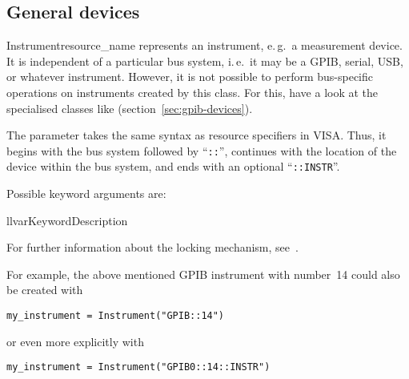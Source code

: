 \documentclass{howto}
\begin{document}
\subsection{General devices}
\label{sec:general-devices}

\begin{classdesc}{Instrument}{resource_name}
  represents an instrument, e.\,g.\ a measurement device.  It is independent of
  a particular bus system, i.\,e.\ it may be a GPIB, serial, USB, or whatever
  instrument.  However, it is not possible to perform bus-specific operations
  on instruments created by this class.  For this, have a look at the
  specialised classes like 
  (section~\ref{sec:gpib-devices}).

  The parameter  takes the same syntax as resource
  specifiers in VISA\@.  Thus, it begins with the bus system followed by
  ``\verb|::|'', continues with the location of the device within the bus
  system, and ends with an optional ``\verb|::INSTR|''.

  Possible keyword arguments are:
  \begin{tableii}{ll}{var}{Keyword}{Description}
  \end{tableii}

  \vspace{1ex}
  For further information about the locking mechanism,
  see~.
\end{classdesc}

For example, the above mentioned GPIB instrument with number~14 could also be
created with
\begin{verbatim}
my_instrument = Instrument("GPIB::14")
\end{verbatim}
or even more explicitly with
\begin{verbatim}
my_instrument = Instrument("GPIB0::14::INSTR")
\end{verbatim}
\end{document}
